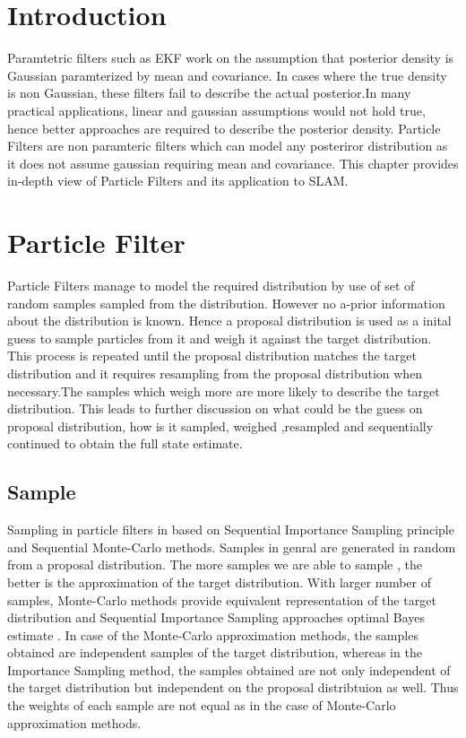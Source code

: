 \section*{Introduction}
    Paramtetric filters such as EKF work on the assumption that posterior density is Gaussian paramterized by mean and covariance. In cases where the 
true density is non Gaussian, these filters fail to describe the actual posterior.In many practical applications, linear and gaussian assumptions would
not hold true, hence better approaches are required to describe the posterior density. Particle Filters are non paramteric filters which can model 
any posteriror distribution as it does not assume gaussian requiring mean and covariance. This chapter provides in-depth view of Particle Filters and
its application to SLAM.
\section{Particle Filter}
Particle Filters manage to model the required distribution by use of set of random samples sampled from the distribution. However no a-prior information about the 
distribution is known. Hence a proposal distribution is used as a inital guess to sample particles from it and weigh it against the target distribution.
This process is repeated until the proposal distribution matches the target distribution and it requires resampling from the proposal distribution when 
necessary.The samples which weigh more are more likely to describe the target distribution. This leads to further discussion on what could be the guess 
on proposal distribution, how is it sampled, weighed ,resampled and sequentially continued to obtain the full state estimate.

\subsection{Sample}
Sampling in particle filters in based on Sequential Importance Sampling principle and Sequential Monte-Carlo methods. Samples in genral are generated in 
random from a proposal distribution. The more samples we are able to sample , the better is the approximation of the target distribution. With larger 
number of samples, Monte-Carlo methods provide equivalent representation of the target distribution and Sequential Importance Sampling approaches optimal
Bayes estimate \cite{S.Arulampalam}. In case of the Monte-Carlo approximation methods, the samples obtained are independent samples of the target distribution,
whereas in the Importance Sampling method, the samples obtained are not only independent of the target distribution but independent on the proposal distribtuion
as well. Thus the weights of each sample are not equal as in the case of Monte-Carlo approximation methods.

